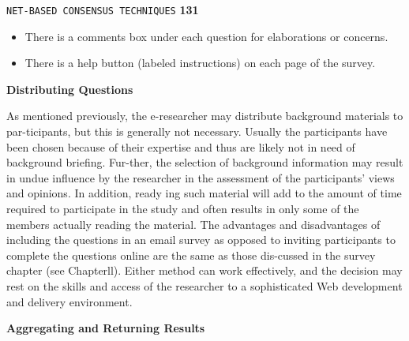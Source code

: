 \documentclass[12pt]{article}
\begin{document}
\newpage
\begin{flushright}
 \texttt{NET-BASED CONSENSUS TECHNIQUES} \hspace*{1cm} \textbf{131}
\end{flushright}

\vspace*{0.5cm}
\begin{itemize}
  \item There is a comments box under each question for elaborations or concerns.\\
  \item There is a help button (labeled instructions) on each page of the survey.\\
\end{itemize}

\vspace*{0.3cm}
\large{

\vspace{3mm}
\hspace{-1cm}
\textbf{Distributing Questions}\\
\vspace{3mm}
}

As mentioned previously, the e-researcher may distribute background materials to par-ticipants, but this is generally not necessary. Usually the participants have been chosen because of their expertise and thus are likely not in need of background briefing. Fur-ther, the selection of background information may result in undue influence by the researcher in the assessment of the participants' views and opinions. In addition, ready ing such material will add to the amount of time required to participate in the study and often results in only some of the members actually reading the material. The advantages and disadvantages of including the questions in an email survey as opposed to inviting participants to complete the questions online are the same as those dis-cussed in the survey chapter (see Chapterll). Either method can work effectively, and the decision may rest on the skills and access of the researcher to a sophisticated Web development and delivery environment.\\

\vspace*{0.3cm}

\large{
\vspace{3mm}
\hspace{-1cm}
\textbf{Aggregating and Returning Results}\\
\vspace{3mm}
}
\end{document}
